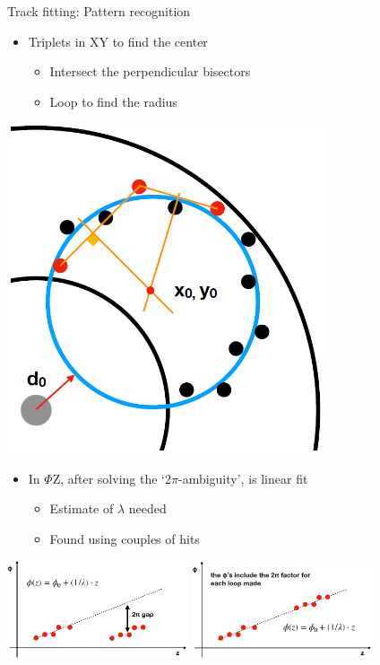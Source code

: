 \documentclass[10pt]{beamer}
\begin{document}
%
\begin{frame}{Track fitting: Pattern recognition}
\noindent
\begin{minipage}{.6\textwidth}
	\begin{itemize}
	\item Triplets in XY to find the center
	\begin{itemize}
	\setlength\itemsep{0.2cm}
		\item Intersect the perpendicular bisectors
		\item Loop to find the radius
	\end{itemize}
	\end{itemize}
\end{minipage}
\begin{minipage}{0.35\textwidth}
    \centering
    \includegraphics[width=0.7\textwidth]{giani_TrkPatRec_triplets}
\end{minipage}

\begin{itemize}
\item In $\Phi$Z, after solving the `2$\pi$-ambiguity', is linear fit 
	\begin{itemize}
	\setlength\itemsep{0.2cm}
		\item Estimate of $\lambda$ needed
		\item Found using couples of hits
	\end{itemize}
\end{itemize}
\centering
\includegraphics[width=0.4\textwidth]{giani_TrkPatRec_ambiguity0}
\includegraphics[width=0.4\textwidth]{giani_TrkPatRec_ambiguity1}
\end{frame}
\end{document}
